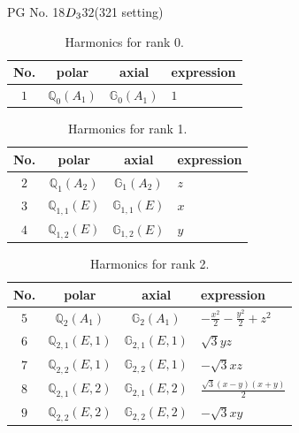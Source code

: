 \documentclass[fleqn,8pt,landscape]{jsarticle}
\begin{document}
\setcounter{MaxMatrixCols}{32}

\renewcommand{\tablename}{Table~}
\renewcommand{\figurename}{Figure~}
\begin{center}
\LARGE
PG No. 18\quad$D_{\rm 3}$\quad$32$\quad(321 setting)\quad[ trigonal ]
\end{center}
\begin{table}[ht!]
\begin{center}
\caption{Harmonics for rank 0.}
\renewcommand{\arraystretch}{1.3}
\begin{tabular}{cccl} \hline \hline
No. & polar & axial & expression \\ \hline
$ 1 $ & $ \mathbb{Q}_{0}(A_{1}) $ & $ \mathbb{G}_{0}(A_{1}) $ & $ 1 $ \\
 \hline \hline
\end{tabular}
\end{center}
\end{table}
\begin{table}[ht!]
\begin{center}
\caption{Harmonics for rank 1.}
\renewcommand{\arraystretch}{1.3}
\begin{tabular}{cccl} \hline \hline
No. & polar & axial & expression \\ \hline
$ 2 $ & $ \mathbb{Q}_{1}(A_{2}) $ & $ \mathbb{G}_{1}(A_{2}) $ & $ z $ \\
$ 3 $ & $ \mathbb{Q}_{1,1}(E) $ & $ \mathbb{G}_{1,1}(E) $ & $ x $ \\
$ 4 $ & $ \mathbb{Q}_{1,2}(E) $ & $ \mathbb{G}_{1,2}(E) $ & $ y $ \\
 \hline \hline
\end{tabular}
\end{center}
\end{table}
\begin{table}[ht!]
\begin{center}
\caption{Harmonics for rank 2.}
\renewcommand{\arraystretch}{1.3}
\begin{tabular}{cccl} \hline \hline
No. & polar & axial & expression \\ \hline
$ 5 $ & $ \mathbb{Q}_{2}(A_{1}) $ & $ \mathbb{G}_{2}(A_{1}) $ & $ - \frac{x^{2}}{2} - \frac{y^{2}}{2} + z^{2} $ \\
$ 6 $ & $ \mathbb{Q}_{2,1}(E,1) $ & $ \mathbb{G}_{2,1}(E,1) $ & $ \sqrt{3} y z $ \\
$ 7 $ & $ \mathbb{Q}_{2,2}(E,1) $ & $ \mathbb{G}_{2,2}(E,1) $ & $ - \sqrt{3} x z $ \\
$ 8 $ & $ \mathbb{Q}_{2,1}(E,2) $ & $ \mathbb{G}_{2,1}(E,2) $ & $ \frac{\sqrt{3} \left(x - y\right) \left(x + y\right)}{2} $ \\
$ 9 $ & $ \mathbb{Q}_{2,2}(E,2) $ & $ \mathbb{G}_{2,2}(E,2) $ & $ - \sqrt{3} x y $ \\
 \hline \hline
\end{tabular}
\end{center}
\end{table}
\end{document}
